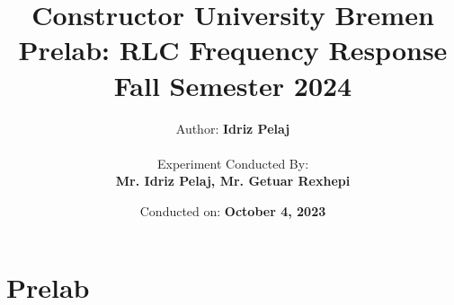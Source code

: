 \documentclass[12pt]{report}
\title{
    \textbf{Constructor University Bremen} \\
    \vspace{1cm}
    \textbf{Prelab: RLC Frequency Response} \\ 
    Fall Semester 2024 \\
}
\author{
    Author: \textbf{Idriz Pelaj} \\
    \vspace{1cm} \\
    Experiment Conducted By: \\ \textbf{Mr. Idriz Pelaj, Mr. Getuar Rexhepi}
}
\date{Conducted on: \textbf{October 4, 2023}}
\begin{document}
\maketitle

\chapter{Prelab}
\vspace{-1cm}

\end{document}
